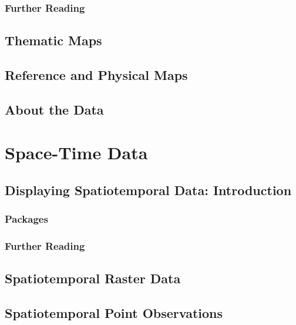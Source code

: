 \documentclass[smallroyalvopaper]{memoir}
\begin{document}
\section{Further Reading}
\label{sec:org12d0730}
\label{cha:further-reading-spatial}

\chapter{Thematic Maps}
\label{sec:org4430e6e}
\label{cha:thematicMaps}

\chapter{Reference and Physical Maps}
\label{sec:orgb447588}
\label{cha:refer-phys-maps}

\chapter{About the Data}
\label{sec:orgd5bcd81}
\label{cha:dataSpatial}

\part{Space-Time Data}
\label{sec:orgc621743}

\chapter{Displaying Spatiotemporal Data: Introduction}
\label{sec:orge15def4}
\label{cha:introductionST}

\section{Packages}
\label{sec:orgb300db5}
\label{sec:spacetime-packages}

\section{Further Reading}
\label{sec:org934692c}
\label{cha:further-reading-spatiotime}

\chapter{Spatiotemporal Raster Data}
\label{sec:org17a39b5}
\label{cha:rasterST}

\chapter{Spatiotemporal Point Observations}
\label{sec:orgceead09}
\label{cha:pointsST}

\backmatter

\printbibliography

\clearpage

\printindex
\end{document}
